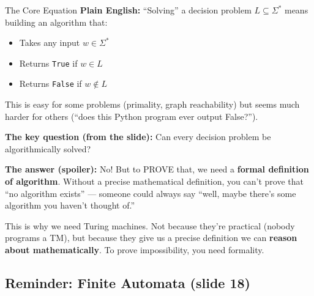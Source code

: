 \documentclass[11pt,a4paper]{article}
\newcommand{\kt}[1]{\par\vspace{0.3em}\colorbox{yellow!60}{\parbox{\dimexpr\linewidth-2\fboxsep}{#1}}\vspace{0.3em}}
\begin{document}
\begin{conceptbox}{The Core Equation}
\textbf{Plain English:} ``Solving'' a decision problem $L \subseteq \Sigma^*$ means building an algorithm that:
\begin{itemize}[nosep]
\item Takes any input $w \in \Sigma^*$
\item Returns \texttt{True} if $w \in L$
\item Returns \texttt{False} if $w \notin L$
\end{itemize}

This is easy for some problems (primality, graph reachability) but seems much harder for others (``does this Python program ever output False?'').

\textbf{The key question (from the slide):} Can every decision problem be algorithmically solved?

\textbf{The answer (spoiler):} No! But to PROVE that, we need a \textbf{formal definition of algorithm}. Without a precise mathematical definition, you can't prove that ``no algorithm exists'' --- someone could always say ``well, maybe there's some algorithm you haven't thought of.''

\kt{This is why we need Turing machines. Not because they're practical (nobody programs a TM), but because they give us a precise definition we can \textbf{reason about mathematically}. To prove impossibility, you need formality.}
\end{conceptbox}

\subsection{Reminder: Finite Automata (slide 18)}
\end{document}
